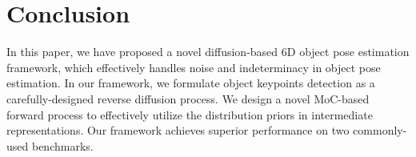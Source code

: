 \documentclass[10pt,twocolumn,letterpaper]{article}
\begin{document}
\section{Conclusion}
In this paper, we have proposed a novel diffusion-based 6D object pose estimation framework, which effectively handles noise and indeterminacy in object pose estimation. 
In our framework, we formulate object keypoints detection as a carefully-designed reverse diffusion process. 
We design a novel MoC-based forward process to effectively utilize the distribution priors in intermediate representations. 
Our framework achieves superior performance on two commonly-used benchmarks.


{
\small


}
\end{document}
